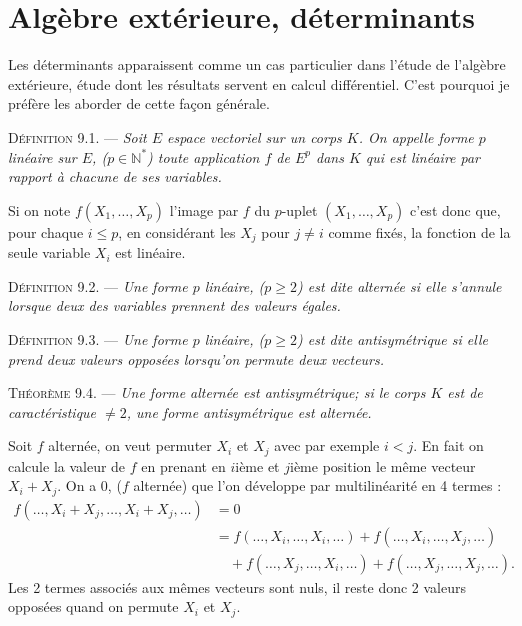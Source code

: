 \chapter{Algèbre extérieure, déterminants}

Les déterminants apparaissent comme un cas particulier dans l'étude  de l'algèbre extérieure, étude dont les résultats servent en calcul différentiel. C'est pourquoi je préfère les aborder de cette façon générale.


\medskip\noindent\textsc{Définition 9.1.} --- \emph{Soit $E$ espace vectoriel sur un corps $K$. On appelle forme $p$ linéaire sur $E$, ($p\in\mathbb N^*$) toute application $f$ de $E^p$ dans $K$ qui est linéaire par rapport à chacune de ses variables.}

Si on note $f(X_1,\ldots,X_p)$ l'image par $f$ du $p$-uplet $(X_1,\ldots,X_p)$ c'est donc que, pour chaque $i\le p$, en considérant les $X_j$ pour $j\ne i$ comme fixés, la fonction de la seule variable $X_i$ est linéaire.

\medskip\noindent\textsc{Définition 9.2.} --- \emph{Une forme $p$ linéaire, ($p\ge 2$) est dite alternée si elle s'annule lorsque deux des variables prennent des valeurs égales.}

\medskip\noindent\textsc{Définition 9.3.} --- \emph{Une forme $p$ linéaire, ($p\ge 2$) est dite antisymétrique si elle prend deux valeurs opposées lorsqu'on permute deux vecteurs.}

\medskip\noindent\textsc{Théorème 9.4.} --- \emph{Une forme alternée est antisymétrique; si le corps $K$ est de caractéristique $\ne 2$, une forme antisymétrique est alternée.}

Soit $f$ alternée, on veut permuter $X_i$ et $X_j$ avec par exemple $i<j$. En fait on calcule la valeur de $f$ en prenant en $i$ième et $j$ième position le même vecteur $X_i+X_j$. On a 0, ($f$ alternée) que l'on développe par multilinéarité en 4 termes :
\begin{align*}
f(\ldots,X_i+X_j,\ldots,X_i+X_j,\ldots)&=0\\
&=f(\ldots,X_i,\ldots,X_i,\ldots)+f(\ldots,X_i,\ldots,X_j,\ldots)\\
&\quad+f(\ldots,X_j,\ldots,X_i,\ldots)+f(\ldots,X_j,\ldots,X_j,\ldots).
\end{align*}
Les 2 termes associés aux mêmes vecteurs sont nuls, il reste donc 2 valeurs opposées quand on permute $X_i$ et $X_j$.

